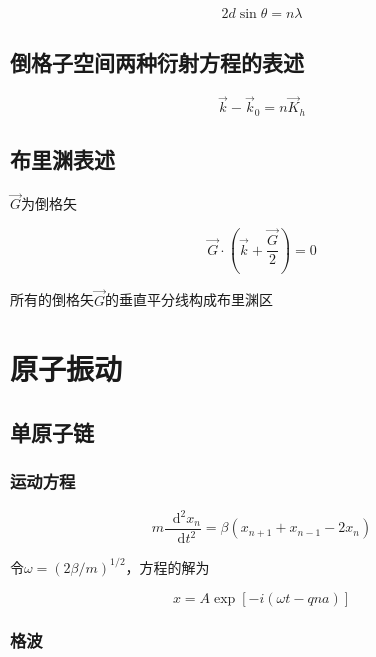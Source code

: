 \documentclass{article}
\newcommand*{\md}{\mathop{}\!\mathrm{d}}
\begin{document}
\begin{multicols}{2}
\begin{equation*}
  2d \sin \theta = n\lambda
\end{equation*}

\subsection{倒格子空间两种衍射方程的表述}

\begin{equation*}
  \vec{k} - \vec{k}_0 = n \vec{K}_h
\end{equation*}

\subsection{布里渊表述}

$\vec{G}$为倒格矢

\begin{equation*}
  \vec{G} \cdot \left( \vec{k} + \dfrac{\vec{G}}{2} \right) = 0
\end{equation*}

所有的倒格矢$\vec{G}$的垂直平分线构成布里渊区

\section{原子振动}

\subsection{单原子链}

\subsubsection{运动方程}

\begin{equation*}
  m \dfrac{\md^2 x_n}{\md t^2} = \beta \left( x_{n+1} + x_{n-1} - 2x_n \right)
\end{equation*}

令$\omega=\left( 2\beta/m \right)^{1/2}$，方程的解为

\begin{equation*}
  x=A\exp \left[ - i \left( \omega t - qna \right) \right]
\end{equation*}

\subsubsection{格波}


\end{multicols}
\end{document}
